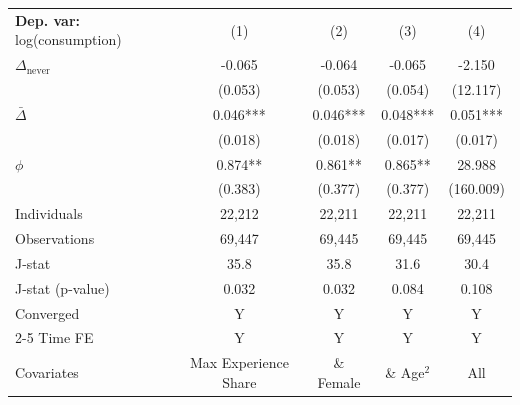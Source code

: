 \begin{tabular}{l cccc} \toprule  \textbf{Dep. var:}  log(consumption) 
                    &\multicolumn{1}{c}{(1)}   &\multicolumn{1}{c}{(2)}   &\multicolumn{1}{c}{(3)}   &\multicolumn{1}{c}{(4)}   \\

\addlinespace
$\Delta_{\text{never}}$&      -0.065   &      -0.064   &      -0.065   &      -2.150   \\
                    &     (0.053)   &     (0.053)   &     (0.054)   &    (12.117)   \\

\addlinespace
$\bar{\Delta}$      &       0.046***&       0.046***&       0.048***&       0.051***\\
                    &     (0.018)   &     (0.018)   &     (0.017)   &     (0.017)   \\

\addlinespace
$\phi$              &       0.874** &       0.861** &       0.865** &      28.988   \\
                    &     (0.383)   &     (0.377)   &     (0.377)   &   (160.009)   \\
\addlinespace
Individuals         &      22,212   &      22,211   &      22,211   &      22,211   \\
Observations        &      69,447   &      69,445   &      69,445   &      69,445   \\
J-stat              &        35.8   &        35.8   &        31.6   &        30.4   \\
J-stat (p-value)    &       0.032   &       0.032   &       0.084   &       0.108   \\
Converged           &           Y   &           Y   &           Y   &           Y   \\
\cmidrule{2-5} Time FE & Y & Y & Y & Y \\ Covariates & Max Experience Share & \& Female & \& Age$^2$ & All \\ \bottomrule \end{tabular}
